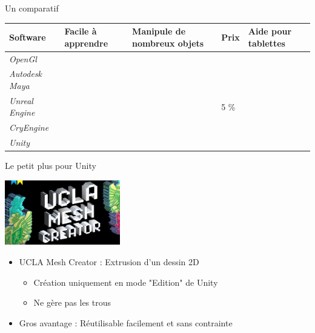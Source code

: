 \documentclass[a4paper,10pt]{beamer}
\begin{document}
		\begin{frame}{Un comparatif}
			\begin{tabular}{|M{45pt}|M{40pt}|M{45pt}|M{75pt}|M{30pt}|}
				\hline
				\textbf{Software} & \textbf{Facile à apprendre} & \textbf{Manipule de nombreux objets} & \textbf{Prix} & \textbf{Aide pour tablettes}\\
				\hline
				\textit{OpenGl} & \color{red}{$\times$} & \color{orange}{$\sim$} & \color{green}{0\euro} & \color{red}{$\times$}\\
				\hline
				\textit{Autodesk Maya} & \color{red}{$\times$} & \color{green}{\checkmark} & \color{red}{\$185.00/mois} & \color{orange}{$\sim$}\\
				\hline
				\textit{Unreal Engine} & \color{green}{\checkmark} & \color{green}{\checkmark} & \color{orange}5 \% & \color{red}{$\times$}\\
				\hline
				\textit{CryEngine} & \color{green}{\checkmark} & \color{green}{\checkmark} & \color{orange}{9.99\euro/mois} & \color{orange}{$\sim$}\\
				\hline
				\textit{Unity} & \color{green}{\checkmark} & \color{green}{\checkmark} & \color{green}{0\euro : licence gratuite} & \color{green}{\checkmark} \\
				\hline
			\end{tabular}
		\end{frame}
		
		\begin{frame}{Le petit plus pour Unity}
			\centerline{\includegraphics[height=80pt]{images/techno/ucla.jpg}}
			
			\begin{itemize}
				\item UCLA Mesh Creator : Extrusion d'un dessin 2D
					\begin{itemize}
						\item Création uniquement en mode "Edition" de Unity
						\item Ne gère pas les trous
					\end{itemize}
				\item Gros avantage : Réutilisable facilement et sans contrainte
			\end{itemize}
			
		\end{frame}
		
\end{document}
